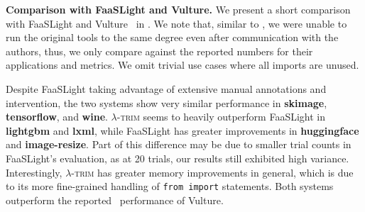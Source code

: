\documentclass[sigplan,nonacm]{acmart}
\newcommand{\sys}{\textsc{\ensuremath{\lambda}-trim}\xspace}
\newcommand{\heading}[1]{\vspace{4pt}\noindent\textbf{#1.}}
\newcommand{\application}[1]{{\textcolor{pennblue}{\textbf{#1}}}}
\begin{document}
\heading{Comparison with FaaSLight and Vulture}
We present a short comparison with FaaSLight \cite{faaslight2023} and Vulture~\cite{vulture} in .
We note that, similar to \cite{libprof2024}, we were unable to run the original tools to the same degree even after communication with the authors, thus, we only compare against the reported numbers for their applications and metrics.
We omit trivial use cases where all imports are unused.

Despite FaaSLight taking advantage of extensive manual annotations and intervention, the two systems show very similar performance in \application{skimage}, \application{tensorflow}, and \application{wine}.
\sys seems to heavily outperform FaaSLight in \application{lightgbm} and \application{lxml}, while FaaSLight has greater improvements in \application{huggingface} and \application{image-resize}.
Part of this difference may be due to smaller trial counts in FaaSLight's evaluation, as at 20 trials, our results still exhibited high variance.
Interestingly, \sys has greater memory improvements in general, which is due to its more fine-grained handling of \verb|from import| statements.
Both systems outperform the reported~\cite{faaslight2023} performance of Vulture.
\end{document}
